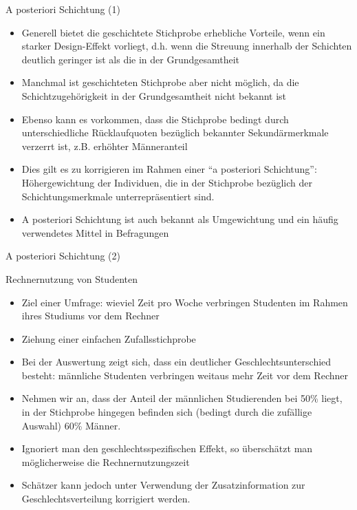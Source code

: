 \documentclass[9pt]{beamer}
\begin{document}
\begin{frame}{A posteriori Schichtung (1)}
\begin{itemize}
	\item Generell bietet die geschichtete Stichprobe erhebliche Vorteile, wenn ein starker
	Design-Effekt vorliegt, d.h. wenn die Streuung innerhalb der Schichten deutlich
	geringer ist als die in der Grundgesamtheit
	\item Manchmal ist geschichteten Stichprobe aber nicht möglich, da die Schichtzugehörigkeit in der
	Grundgesamtheit nicht bekannt ist
	\item Ebenso kann es vorkommen, dass die Stichprobe
	bedingt durch unterschiedliche Rücklaufquoten bezüglich bekannter Sekundärmerkmale
	verzerrt ist, z.B. erhöhter Männeranteil
	\item Dies gilt es zu korrigieren im Rahmen einer \enquote{a
	posteriori Schichtung}: Höhergewichtung der Individuen, die in der Stichprobe bezüglich der Schichtungsmerkmale unterrepräsentiert sind.
		\item A posteriori Schichtung ist auch bekannt als Umgewichtung und ein häufig verwendetes
	Mittel in Befragungen
\end{itemize}
\end{frame}

\begin{frame}{A posteriori Schichtung (2)}
	\begin{block}{Rechnernutzung von Studenten}
		\begin{itemize}
			\item Ziel einer Umfrage: wieviel Zeit pro
			Woche verbringen Studenten im Rahmen ihres Studiums vor dem Rechner
			\item Ziehung einer einfachen Zufallsstichprobe
			\item Bei der Auswertung zeigt sich, dass ein deutlicher Geschlechtsunterschied besteht: männliche Studenten verbringen weitaus mehr Zeit vor dem Rechner
			\item Nehmen wir an, dass der Anteil der
			männlichen Studierenden bei 50\% liegt, in der Stichprobe hingegen befinden
			sich (bedingt durch die zufällige Auswahl) 60\% Männer. 
			\item Ignoriert man den geschlechtsspezifischen
			Effekt, so überschätzt man möglicherweise die Rechnernutzungszeit
			\item Schätzer kann jedoch unter Verwendung der Zusatzinformation zur Geschlechtsverteilung korrigiert
			werden.
		\end{itemize}

\end{block}
\end{frame}
\end{document}
